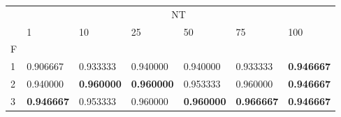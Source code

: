 \begin{table}[htbp]
\centering
\label{iris-results}
\begin{tabular}{lllllll}
\toprule
 & \multicolumn{6}{c}{NT} \\
 & 1 & 10 & 25 & 50 & 75 & 100 \\
F &  &  &  &  &  &  \\
\midrule
1 & 0.906667 & 0.933333 & 0.940000 & 0.940000 & 0.933333 & \textbf{0.946667} \\
2 & 0.940000 & \textbf{0.960000} & \textbf{0.960000} & 0.953333 & 0.960000 & \textbf{0.946667} \\
3 & \textbf{0.946667} & 0.953333 & 0.960000 & \textbf{0.960000} & \textbf{0.966667} & \textbf{0.946667} \\
\bottomrule
\end{tabular}
\end{table}
